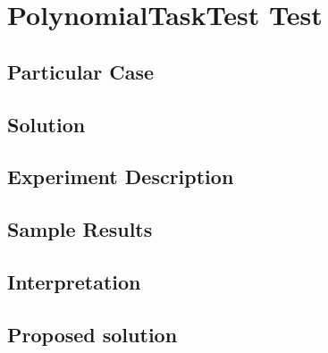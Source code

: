 \section{\textbf{PolynomialTaskTest Test}}
\subsection{Particular Case}
\par
\par
\subsection{Solution}
\par
\par
\subsection{Experiment Description}
\par
\par
\subsection{Sample Results}
\par
\par
\subsection{Interpretation}
\par
\par
\subsection{Proposed solution}
\par
\par
